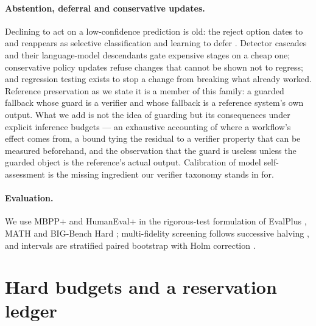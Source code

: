 \documentclass{article}
\begin{document}
\paragraph{Abstention, deferral and conservative updates.} Declining to act on
a low-confidence prediction is old: the reject option dates to
\citet{chow1970reject} and reappears as selective classification
\citep{geifman2017selective} and learning to defer
\citep{madras2018defer, mozannar2020defer}. Detector cascades
\citep{viola2001cascade} and their language-model descendants
\citep{chen2023frugalgpt} gate expensive stages on a cheap one; conservative
policy updates \citep{thomas2015safe, garcelon2020conservative} refuse changes
that cannot be shown not to regress; and regression testing
\citep{cohen1995regression} exists to stop a change from breaking what already
worked. Reference preservation as we state it is a member of this family: a
guarded fallback whose guard is a verifier and whose fallback is a reference
system's own output. What we add is not the idea of guarding but its
consequences under explicit inference budgets --- an exhaustive accounting of
where a workflow's effect comes from, a bound tying the residual to a verifier
property that can be measured beforehand, and the observation that the guard is
useless unless the guarded object is the reference's actual output.
Calibration of model self-assessment \citep{kadavath2022know} is the missing
ingredient our verifier taxonomy stands in for.

\paragraph{Evaluation.} We use MBPP+ and HumanEval+ \citep{austin2021mbpp,
chen2021humaneval} in the rigorous-test formulation of EvalPlus
\citep{liu2023evalplus}, MATH \citep{hendrycks2021math} and BIG-Bench Hard
\citep{suzgun2023bbh}; multi-fidelity screening follows successive halving
\citep{jamieson2016successive, li2018hyperband}, and intervals are stratified
paired bootstrap \citep{efron1994bootstrap} with Holm correction
\citep{holm1979}.

\section{Hard budgets and a reservation ledger}
\label{sec:setup}
\end{document}

